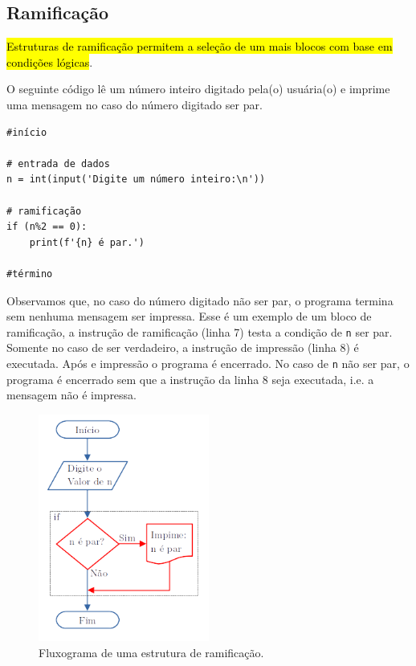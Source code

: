 \subsection{Ramificação}

\hl{Estruturas de ramificação permitem a seleção de um mais blocos com base em condições lógicas}.

\begin{ex}\label{cap_progest_sec_est:ex:ramifica}
  O seguinte código lê um número inteiro digitado pela(o) usuária(o) e imprime uma mensagem no caso do número digitado ser par.
\begin{lstlisting}
#início

# entrada de dados
n = int(input('Digite um número inteiro:\n'))

# ramificação
if (n%2 == 0):
    print(f'{n} é par.')

#término
\end{lstlisting}
  Observamos que, no caso do número digitado não ser par, o programa termina sem nenhuma mensagem ser impressa. Esse é um exemplo de um bloco de ramificação, a instrução de ramificação (linha 7) testa a condição de \lstinline+n+ ser par. Somente no caso de ser verdadeiro, a instrução de impressão (linha 8) é executada. Após e impressão o programa é encerrado. No caso de \lstinline+n+ não ser par, o programa é encerrado sem que a instrução da linha 8 seja executada, i.e. a mensagem não é impressa.

\begin{figure}[H]
  \centering
  \includegraphics[width=0.5\textwidth]{./cap_progest/dados/fig_fg_ramifica/fig}
  \caption{Fluxograma de uma estrutura de ramificação.}
  \label{cap_progest:fig:fg_ramifica}
\end{figure}
  
\end{ex}

